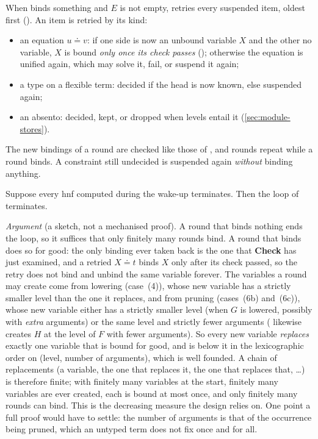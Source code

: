 When  binds something and $E$ is not empty,  retries every suspended item, oldest
first (). An item is retried by its kind:
\begin{itemize}
  \item an equation $u\doteq v$: if one side is now an unbound variable $X$ and the other no variable, $X$ is
    bound \emph{only once its check passes} (); otherwise the equation is unified
    again, which may solve it, fail, or suspend it again;
  \item a type on a flexible term: decided if the head is now known, else suspended again;
  \item an absento: decided, kept, or dropped when levels entail it (\cref{sec:module-stores}).
\end{itemize}
The new bindings of a round are checked like those of , and rounds repeat while a round binds. A
constraint still undecided is suspended again \emph{without} binding anything.

\begin{proposition}\label{prop:module-wake}
Suppose every hnf computed during the wake-up terminates. Then the loop of  terminates.
\end{proposition}
\noindent\emph{Argument} (a sketch, not a mechanised proof). A round that binds nothing ends the loop, so it
suffices that only finitely many rounds bind. A round that binds does so for good: the only binding ever taken back is the one
that \textbf{Check} has just examined, and a retried $X \doteq t$ binds $X$ only after its check passed, so the
retry does not bind and unbind the same variable forever. The variables a round may create come from lowering
(case~(4)), whose new variable has a strictly smaller level than the one it replaces, and from pruning
(cases~(6b) and~(6c)), whose new variable either has a strictly smaller level (when $G$ is lowered, possibly with
\emph{extra} arguments) or the same level and strictly fewer arguments ( likewise creates
$H$ at the level of $F$ with fewer arguments). So every new variable \emph{replaces} exactly one variable that
is bound for good, and is below it in the lexicographic order on (level, number of arguments), which is well
founded. A chain of replacements (a variable, the one that replaces it, the one that replaces that, \dots) is
therefore finite; with finitely many variables at the start, finitely many variables are ever created, each is
bound at most once, and only finitely many rounds can bind. This is the decreasing measure the design relies on.
One point a full proof would have to settle: the number of arguments is that of the occurrence being pruned,
which an untyped term does not fix once and for all. \hfill\qedsymbol

